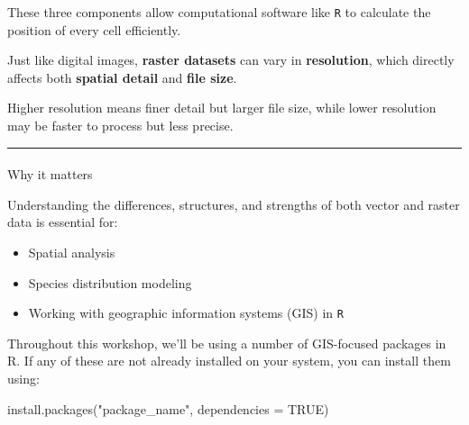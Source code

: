 \documentclass[
]{book}
\makeatletter
\let\oldparagraph\paragraph
\renewcommand{\paragraph}{
    \@ifstar
      \xxxParagraphStar
      \xxxParagraphNoStar
  }
\newcommand{\xxxParagraphStar}[1]{\oldparagraph*{#1}\mbox{}}
\newcommand{\xxxParagraphNoStar}[1]{\oldparagraph{#1}\mbox{}}
\newenvironment{Shaded}{\begin{snugshade}}{\end{snugshade}}
\newcommand{\AttributeTok}[1]{\textcolor[rgb]{0.40,0.45,0.13}{#1}}
\newcommand{\ConstantTok}[1]{\textcolor[rgb]{0.56,0.35,0.01}{#1}}
\newcommand{\FunctionTok}[1]{\textcolor[rgb]{0.28,0.35,0.67}{#1}}
\newcommand{\NormalTok}[1]{\textcolor[rgb]{0.00,0.23,0.31}{#1}}
\newcommand{\StringTok}[1]{\textcolor[rgb]{0.13,0.47,0.30}{#1}}
\providecommand{\tightlist}{%
  \setlength{\itemsep}{0pt}\setlength{\parskip}{0pt}}
\makeatother
\begin{document}
These three components allow computational software like \texttt{R} to
calculate the position of every cell efficiently.

\begin{tcolorbox}[enhanced jigsaw, left=2mm, bottomtitle=1mm, colframe=quarto-callout-tip-color-frame, title=\textcolor{quarto-callout-tip-color}{\faLightbulb}\hspace{0.5em}{Raster and pixels}, breakable, coltitle=black, leftrule=.75mm, bottomrule=.15mm, arc=.35mm, toprule=.15mm, colback=white, toptitle=1mm, rightrule=.15mm, titlerule=0mm, opacityback=0, colbacktitle=quarto-callout-tip-color!10!white, opacitybacktitle=0.6]

Just like digital images, \textbf{raster datasets} can vary in
\textbf{resolution}, which directly affects both \textbf{spatial detail}
and \textbf{file size}.

Higher resolution means finer detail but larger file size, while lower
resolution may be faster to process but less precise.

\end{tcolorbox}

\begin{center}\rule{0.5\linewidth}{0.5pt}\end{center}

\paragraph{Why it matters}\label{why-it-matters}

Understanding the differences, structures, and strengths of both vector
and raster data is essential for:

\begin{itemize}
\tightlist
\item
  Spatial analysis
\item
  Species distribution modeling
\item
  Working with geographic information systems (GIS) in \texttt{R}
\end{itemize}

Throughout this workshop, we'll be using a number of GIS-focused
packages in R. If any of these are not already installed on your system,
you can install them using:

\begin{Shaded}
\begin{Highlighting}[]
\FunctionTok{install.packages}\NormalTok{(}\StringTok{"package\_name"}\NormalTok{, }\AttributeTok{dependencies =} \ConstantTok{TRUE}\NormalTok{)}
\end{Highlighting}
\end{Shaded}
\end{document}
